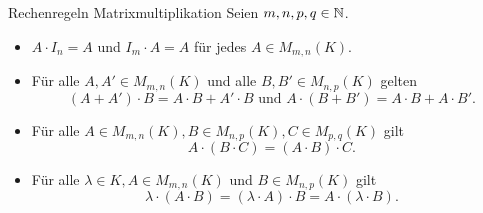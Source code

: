 \documentclass[main.tex]{subfiles}
\begin{document}
\begin{karte}{Rechenregeln Matrixmultiplikation}
    Seien \( m,n,p,q \in \mathbb{N} \).
    \begin{itemize}
        \item \( A \cdot I_n = A \) und \( I_m \cdot A = A \) 
        für jedes \( A \in M_{m,n}(K) \).
        \item Für alle \( A, A' \in M_{m,n}(K) \) und alle 
        \( B,B' \in M_{n,p}(K) \) gelten 
        \[ (A+A')\cdot B = A\cdot B + A' \cdot B \text{ und } 
        A \cdot (B + B') = A \cdot B + A \cdot B'. \]
        \item Für alle \( A \in M_{m,n}(K), B \in M_{n,p}(K), 
        C \in M_{p,q}(K) \) gilt 
        \[ A \cdot (B \cdot C) = (A \cdot B) \cdot C. \]
        \item Für alle \( \lambda \in K, A \in M_{m,n}(K) \) 
        und \( B \in M_{n,p}(K) \) gilt 
        \[ \lambda \cdot (A \cdot B) 
        = (\lambda \cdot A) \cdot B
        = A \cdot (\lambda \cdot B). \]
    \end{itemize}
\end{karte}
\end{document}
